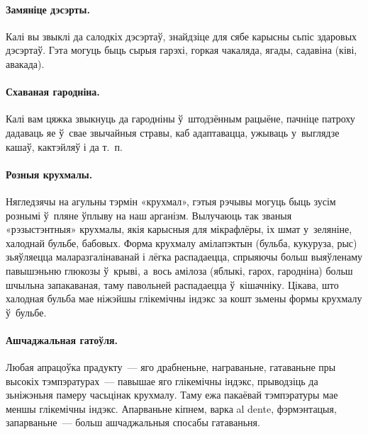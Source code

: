 \paragraph{Замяніце дэсэрты.}
Калі вы звыклі да салодкіх дэсэртаў, знайдзіце для сябе карысны сьпіс здаровых дэсэртаў. Гэта могуць быць сырыя гарэхі, горкая чакаляда, ягады, садавіна (ківі, авакада).


\paragraph{Схаваная гародніна.}
Калі вам цяжка звыкнуць да гародніны ў~штодзённым рацыёне, пачніце патроху дадаваць яе ў~свае звычайныя стравы, каб адаптавацца, ужываць у~выглядзе кашаў, кактэйляў і да т.~п.

\paragraph{Розныя крухмалы.}
Нягледзячы на агульны тэрмін «крухмал», гэтыя рэчывы могуць быць зусім рознымі ў~пляне ўплыву на наш арганізм. Вылучаюць так званыя «рэзыстэнтныя» крухмалы, якія карысныя для мікрафлёры, іх шмат у~зеляніне, халоднай бульбе, бабовых. Форма крухмалу амілапэктын (бульба, кукуруза, рыс) зьяўляецца маларазгалінаванай і лёгка распадаецца, спрыяючы больш выяўленаму павышэньню глюкозы ў~крыві, а~вось амілоза (яблыкі, гарох, гародніна) больш шчыльна запакаваная, таму павольней распадаецца ў~кішачніку. Цікава, што халодная бульба мае ніжэйшы глікемічны індэкс за кошт зьмены формы крухмалу ў~бульбе.

\paragraph{Ашчаджальная гатоўля.}
Любая апрацоўка прадукту~--- яго драбненьне, награваньне, гатаваньне пры высокіх тэмпэратурах~--- павышае яго глікемічны індэкс, прыводзіць да зьніжэньня памеру часьцінак крухмалу. Таму ежа пакаёвай тэмпэратуры мае меншы глікемічны індэкс. Апарваньне кіпнем, варка al dente, фэрмэнтацыя, запарваньне~--- больш ашчаджальныя спосабы гатаваньня.

